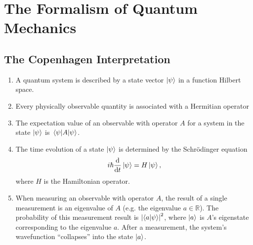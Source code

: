 \documentclass[11pt, a4paper]{article}
\newcommand{\Schro}{Schr\"{o}dinger\xspace}
\begin{document}
\section{The Formalism of Quantum Mechanics}
\subsection{The Copenhagen Interpretation}
\begin{enumerate}
	\item A quantum system is described by a state vector $ \ket{\psi} $ in a function Hilbert space.
	
	\item Every physically observable quantity is associated with a Hermitian operator
	
	\item The expectation value of an observable with operator $ A $ for a system in the state $ \ket{\psi} $ is $ \mel{\psi}{A}{\psi} $.
	
	\item The time evolution of a state $ \ket{\psi} $ is determined by the \Schro equation
	\begin{equation*}
		i \hbar \dv{t} \ket{\psi} = H \ket{\psi},
	\end{equation*}
	where $ H $ is the Hamiltonian operator.
	
	\item When measuring an observable with operator $ A $, the result of a single measurement is an eigenvalue of $ A $ (e.g. the eigenvalue $ a \in \mathbb{R} $). The probability of this measurement result is $ \abs{\braket{a}{\psi}}^{2} $, where $ \ket{a} $ is $ A $'s eigenstate corresponding to the eigenvalue $ a $. After a measurement, the system's wavefunction ``collapses'' into the state $ \ket{a} $.
\end{enumerate}
\end{document}
